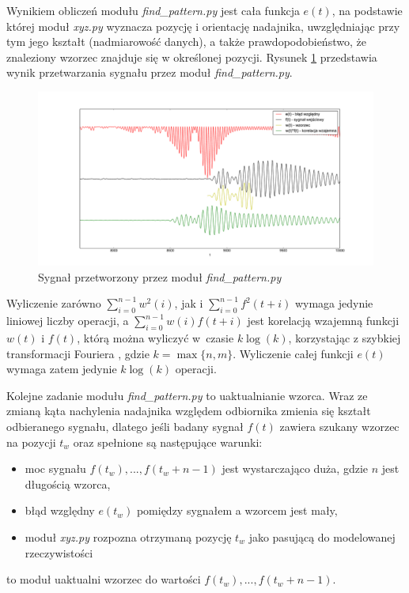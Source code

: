  Wynikiem obliczeń modułu \textit{find\_pattern.py} jest cała funkcja $e(t)$, na podstawie której moduł \textit{xyz.py}
 wyznacza pozycję i orientację nadajnika, uwzględniając przy tym 
 jego kształt (nadmiarowość danych), a także prawdopodobieństwo, że znaleziony wzorzec znajduje się w określonej pozycji.
 Rysunek \ref{fig:blad_korel} przedstawia wynik przetwarzania sygnału przez moduł \textit{find\_pattern.py}.

\begin{figure}[h]
    \centering
    \includegraphics[width=1.0\textwidth, trim= 50mm 0mm 40mm 0mm,clip]{blad_korel}
    \caption{Sygnał przetworzony przez moduł \textit{find\_pattern.py}}
    \label{fig:blad_korel}
\end{figure}
 
 
 Wyliczenie zarówno $ \sum\limits_{i=0}^{n-1}  w^2(i) $,
jak i $\sum\limits_{i=0}^{n-1} f^2(t+i)$ wymaga jedynie liniowej liczby operacji, a 
 $\sum\limits_{i=0}^{n-1}  w(i) f(t+i) $ jest korelacją wzajemną funkcji $w(t)$ i $f(t)$, którą
 można wyliczyć w~czasie $k \log(k)$, korzystając z szybkiej transformacji Fouriera \cite{bib:FFT_correlation},
 gdzie $k = \max \{n,m\}$. Wyliczenie całej funkcji $e(t)$ wymaga zatem jedynie $k \log(k)$ operacji.

 
 Kolejne zadanie modułu \textit{find\_pattern.py} to uaktualnianie wzorca.
 Wraz ze zmianą kąta nachylenia nadajnika względem odbiornika zmienia się kształt odbieranego sygnału,
 dlatego jeśli badany sygnał $f(t)$ zawiera szukany wzorzec na pozycji $t_w$ 
 oraz spełnione są następujące warunki:
 \begin{itemize}
  \item moc sygnału $f(t_w), ..., f(t_w+n-1)$ jest wystarczająco duża, gdzie $n$ jest długością wzorca,
  \item błąd względny $e(t_w)$ pomiędzy sygnałem a wzorcem jest mały,
  \item moduł \textit{xyz.py} rozpozna otrzymaną pozycję $t_w$ jako pasującą do modelowanej rzeczywistości
 \end{itemize}
to moduł uaktualni wzorzec do wartości $f(t_w), ..., f(t_w+n-1)$.
 
